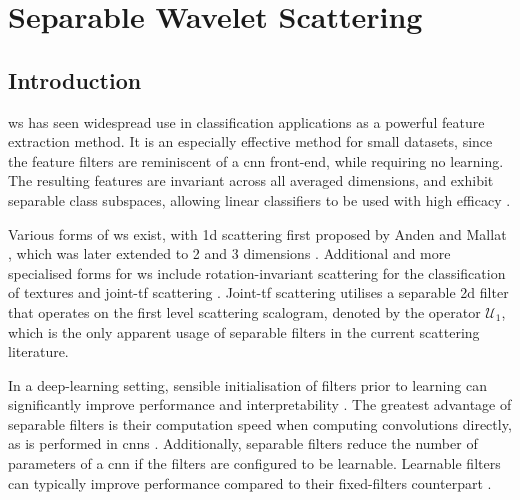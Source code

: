 \chapter{Separable Wavelet Scattering}
\label{chap:p3}






\section{Introduction}
\Ac{ws} has seen widespread use in classification applications as a powerful feature extraction method. It is an especially effective method for small datasets, since the feature filters are reminiscent of a \ac{cnn} front-end, while requiring no learning. The resulting features are invariant across all averaged dimensions, and exhibit separable class subspaces, allowing linear classifiers to be used with high efficacy \citep{2dscattering}.

Various forms of \ac{ws} exist, with \ac{1d} scattering first proposed by Anden and Mallat \citep{1dscattering1, ws}, which was later extended to 2 \citep{2dscattering} and 3 dimensions \citep{3dscattering, harmonicscattering}. Additional and more specialised forms for \ac{ws} include rotation-invariant scattering \citep{groupinvariantscattering} for the classification of textures and joint-\ac{tf} scattering \citep{ws_joint_tf, jointtfscattering2}. Joint-\ac{tf} scattering utilises a separable \ac{2d} filter that operates on the first level scattering scalogram, denoted by the operator $\mathcal{U}_1$, which is the only apparent usage of separable filters in the current scattering literature. 

In a deep-learning setting, sensible initialisation of filters prior to learning can significantly improve performance and interpretability \citep{sincnet}. The greatest advantage of separable filters is their computation speed when computing convolutions directly, as is performed in \acp{cnn} \citep{separablecnn}. Additionally, separable filters reduce the number of parameters of a \ac{cnn} if the filters are configured to be learnable. Learnable filters can typically improve performance compared to their fixed-filters counterpart \citep{scattering_birdsong}. 

